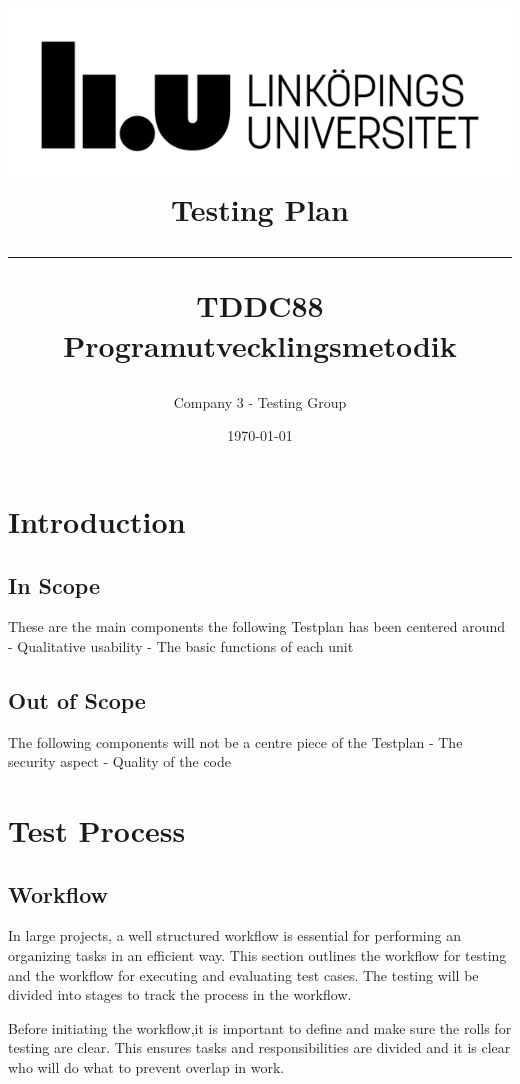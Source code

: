 \documentclass{article}
\title{
\includegraphics[scale=1.5]{liu_logga.png} \\
\vspace{2.0cm} \textbf{Testing Plan} \\
 \endgraf\rule{\textwidth}{.4pt}
  \large \textbf{TDDC88 Programutvecklingsmetodik}\\
   }
\author{Company 3 - Testing Group}
\date{\today}
\begin{document}
\maketitle
\newpage
 

\newpage
\tableofcontents
\newpage




\section{Introduction}

\subsection{In Scope}

These are the main components the following Testplan has been centered around
\newline
\newline - Qualitative usability
\newline- The basic functions of each unit
\subsection{Out of Scope}
The following components will not be a centre piece of the Testplan
\newline
\newline- The security aspect
\newline - Quality of the code

\section{Test Process}
\subsection{Workflow}
In large projects, a well structured workflow is essential for performing an organizing tasks in an efficient way. This section outlines the workflow for testing and the workflow for executing and evaluating test cases. The testing will be divided into stages to track the process in the workflow. \newline

Before initiating the workflow,it is important to define and make sure the rolls for testing are clear. This ensures tasks and responsibilities are divided and it is clear who will do what to prevent overlap in work. \newline
\end{document}
